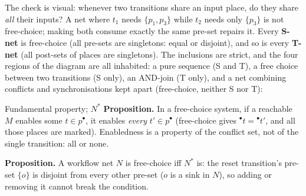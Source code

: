 The check is visual: whenever two transitions share an input place, do they share \emph{all} their inputs? A net where $t_1$ needs $\{p_1, p_3\}$ while $t_2$ needs only $\{p_3\}$ is not free-choice; making both consume exactly the same pre-set repairs it. Every \textbf{S-net} is free-choice (all pre-sets are singletons: equal or disjoint), and so is every \textbf{T-net} (all post-sets of places are singletons). The inclusions are strict, and the four regions of the diagram are all inhabited: a pure sequence (S and T), a free choice between two transitions (S only), an AND-join (T only), and a net combining conflicts and synchronisations kept apart (free-choice, neither S nor T):
\begin{center}
\end{center}

\begin{notebox}{Fundamental property; $N^*$}
\textbf{Proposition.} In a free-choice system, if a reachable $M$ enables some $t \in p^\bullet$, it enables \emph{every} $t' \in p^\bullet$ (free-choice gives ${}^\bullet t = {}^\bullet t'$, and all those places are marked). Enabledness is a property of the conflict set, not of the single transition: all or none.
\par\smallskip
\textbf{Proposition.} A workflow net $N$ is free-choice iff $N^*$ is: the reset transition's pre-set $\{o\}$ is disjoint from every other pre-set ($o$ is a sink in $N$), so adding or removing it cannot break the condition.
\end{notebox}

